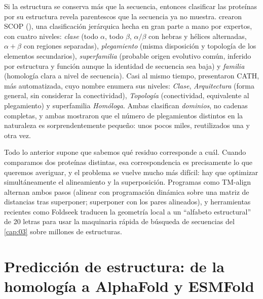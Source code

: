 Si la estructura se conserva más que la secuencia, entonces clasificar las proteínas por su estructura revela parentescos que la secuencia ya no muestra. \textcite{c15-murzin1995} crearon SCOP (), una clasificación jerárquica hecha en gran parte a mano por expertos, con cuatro niveles: \emph{clase} (todo $\alpha$, todo $\beta$, $\alpha/\beta$ con hebras y hélices alternadas, $\alpha+\beta$ con regiones separadas), \emph{plegamiento} (misma disposición y topología de los elementos secundarios), \emph{superfamilia} (probable origen evolutivo común, inferido por estructura y función aunque la identidad de secuencia sea baja) y \emph{familia} (homología clara a nivel de secuencia). Casi al mismo tiempo, \textcite{c15-orengo1997} presentaron CATH, más automatizada, cuyo nombre enumera sus niveles: \emph{Clase}, \emph{Arquitectura} (forma general, sin considerar la conectividad), \emph{Topología} (conectividad, equivalente al plegamiento) y superfamilia \emph{Homóloga}. Ambas clasifican \emph{dominios}, no cadenas completas, y ambas mostraron que el número de plegamientos distintos en la naturaleza es sorprendentemente pequeño: unos pocos miles, reutilizados una y otra vez.

\begin{profundizacion}
Todo lo anterior supone que sabemos qué residuo corresponde a cuál. Cuando comparamos dos proteínas distintas, esa correspondencia es precisamente lo que queremos averiguar, y el problema se vuelve mucho más difícil: hay que optimizar simultáneamente el alineamiento y la superposición. Programas como TM-align alternan ambos pasos (alinear con programación dinámica sobre una matriz de distancias tras superponer; superponer con los pares alineados), y herramientas recientes como Foldseek traducen la geometría local a un ``alfabeto estructural'' de 20 letras para usar la maquinaria rápida de búsqueda de secuencias del \cref{cap:03} sobre millones de estructuras.
\end{profundizacion}

\section{Predicción de estructura: de la homología a AlphaFold y ESMFold}\label{sec:15-prediccion}

